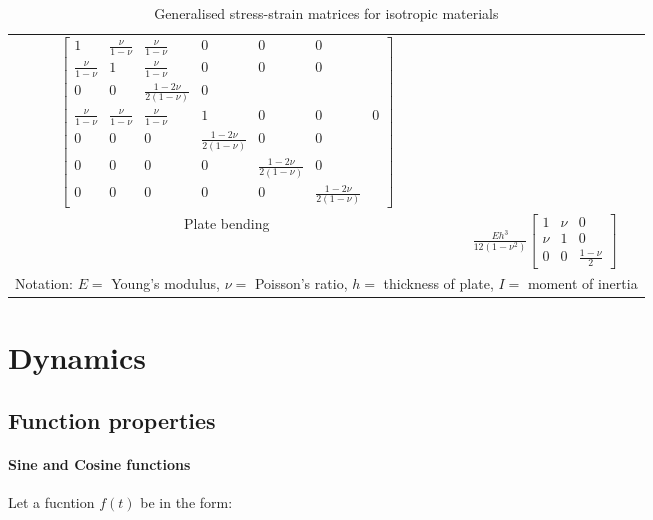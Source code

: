 \documentclass[10pt,b5paper,titlepage]{book}
\begin{document}
\begin{table}[ht]
{\begin{tabular}{||c c||}
\begin{math}
\begin{bmatrix}
                1 & \frac{\nu}{1 - \nu} & \frac{\nu}{1 - \nu} & 0 & 0 & 0 \\
                \frac{\nu}{1 - \nu} & 1 & \frac{\nu}{1 - \nu} & 0 & 0 & 0 \\
                0 & 0 & \frac{1 - 2 \nu}{2 \left(1 - \nu\right)} & 0 \\
                \frac{\nu}{1-\nu} & \frac{\nu}{1-\nu} & \frac{\nu}{1-\nu} & 1 & 0 & 0 & 0 \\
                0 & 0 & 0 & \frac{1 - 2 \nu}{2 \left(1 - \nu \right)} & 0 & 0 \\
                0 & 0 & 0 & 0 & \frac{1 - 2 \nu}{2 \left(1 - \nu \right)} & 0 \\
                0 & 0 & 0 & 0 & 0 & \frac{1 - 2 \nu}{2 \left(1 - \nu \right)}
            \end{bmatrix}
        \end{math} \\
        Plate bending & \begin{math}
            \frac{E h^3}{12 \left(1 - \nu^2 \right)}
            \begin{bmatrix}
                1 & \nu & 0 \\
                \nu & 1 & 0 \\
                0 & 0 & \frac{1 - \nu}{2}
            \end{bmatrix}
        \end{math} \\
        \hline
        \hline
        \multicolumn{2}{l}{
            Notation:
            $ E = $ Young's modulus, $ \nu = $ Poisson's ratio,
            $ h = $ thickness of plate, $ I = $ moment of inertia
        } \\
    \end{tabular}}
    \caption{Generalised stress-strain matrices for isotropic materials}
\end{table}


\newpage
\chapter{Dynamics}

\section{Function properties}

\subsubsection{Sine and Cosine functions}
Let a fucntion $ f(t) $ be in the form:
\end{document}
